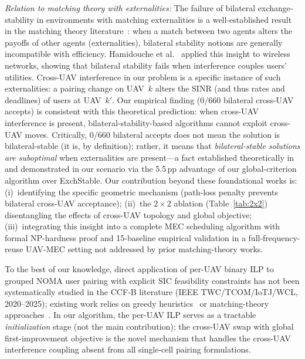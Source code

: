 \documentclass[journal]{IEEEtran}
\begin{document}
\emph{Relation to matching theory with externalities:}
The failure of bilateral exchange-stability in environments with matching externalities is a well-established result in the matching theory literature~\cite{sasaki1996two,echenique2006theory,pycia2012stability}: when a match between two agents alters the payoffs of other agents (externalities), bilateral stability notions are generally incompatible with efficiency.
Hamidouche et al.~\cite{hamidouche2017matching} applied this insight to wireless networks, showing that bilateral stability fails when interference couples users' utilities.
Cross-UAV interference in our problem is a specific instance of such externalities: a pairing change on UAV~$k$ alters the SINR (and thus rates and deadlines) of users at UAV~$k'$.
Our empirical finding (0/660 bilateral cross-UAV accepts) is consistent with this theoretical prediction: when cross-UAV interference is present, bilateral-stability-based algorithms cannot exploit cross-UAV moves.
Critically, 0/660 bilateral accepts does not mean the solution is bilateral-stable (it is, by definition); rather, it means that \emph{bilateral-stable solutions are suboptimal} when externalities are present---a fact established theoretically in~\cite{sasaki1996two} and demonstrated in our scenario via the 5.5\,pp advantage of our global-criterion algorithm over ExchStable.
Our contribution beyond these foundational works is: (i)~identifying the specific geometric mechanism (path-loss penalty prevents bilateral cross-UAV acceptance); (ii)~the $2\!\times\!2$ ablation (Table~\ref{tab:2x2}) disentangling the effects of cross-UAV topology and global objective; (iii)~integrating this insight into a complete MEC scheduling algorithm with formal NP-hardness proof and 15-baseline empirical validation in a full-frequency-reuse UAV-MEC setting not addressed by prior matching-theory works.

To the best of our knowledge, direct application of per-UAV binary ILP to grouped NOMA user pairing with explicit SIC feasibility constraints has not been systematically studied in the CCF-B literature (IEEE TWC/TCOM/IoTJ/WCL, 2020--2025); existing work relies on greedy heuristics~\cite{ali2016dynamic,nguyen2024qos} or matching-theory approaches~\cite{altin2022hybrid,di2017sub}.
In our algorithm, the per-UAV ILP serves as a tractable \emph{initialization} stage (not the main contribution); the cross-UAV swap with global first-improvement objective is the novel mechanism that handles the cross-UAV interference coupling absent from all single-cell pairing formulations.
\end{document}

